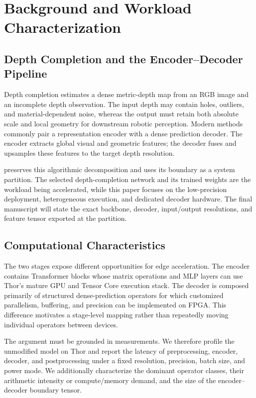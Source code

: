 \section{Background and Workload Characterization}
\label{sec:background}

\subsection{Depth Completion and the Encoder--Decoder Pipeline}

Depth completion estimates a dense metric-depth map from an RGB image and an
incomplete depth observation.  The input depth may contain holes, outliers, and
material-dependent noise, whereas the output must retain both absolute scale
and local geometry for downstream robotic perception.  Modern methods commonly
pair a representation encoder with a dense prediction decoder.  The encoder
extracts global visual and geometric features; the decoder fuses and upsamples
these features to the target depth resolution.

\system{} preserves this algorithmic decomposition and uses its boundary as a
system partition.  The selected depth-completion network and its trained
weights are the workload being accelerated, while this paper focuses on the
low-precision deployment, heterogeneous execution, and dedicated decoder
hardware.  The final manuscript will state the exact backbone, decoder,
input/output resolutions, and feature tensor exported at the partition.

\subsection{Computational Characteristics}

The two stages expose different opportunities for edge acceleration.  The
encoder contains Transformer blocks whose matrix operations and MLP layers can
use Thor's mature GPU and Tensor Core execution stack.  The decoder is composed
primarily of structured dense-prediction operators for which customized
parallelism, buffering, and precision can be implemented on FPGA.  This
difference motivates a stage-level mapping rather than repeatedly moving
individual operators between devices.

The argument must be grounded in measurements.  We therefore profile the
unmodified model on Thor and report the latency of preprocessing, encoder,
decoder, and postprocessing under a fixed resolution, precision, batch size,
and power mode.  We additionally characterize the dominant operator classes,
their arithmetic intensity or compute/memory demand, and the size of the
encoder--decoder boundary tensor.

